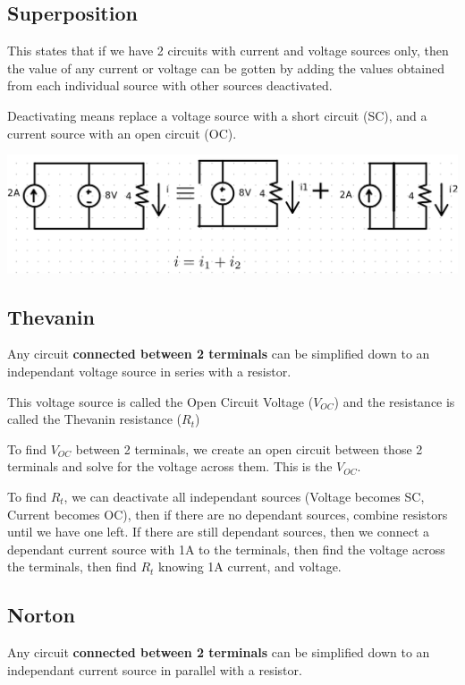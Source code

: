 \documentclass[12pt,letterpaper]{article} \usepackage{amsmath} \usepackage{graphicx} \usepackage[margin=1in]{geometry} \usepackage{longtable}  \usepackage{amssymb}
\begin{document}
	\subsection{Superposition}
	This states that if we have 2 circuits with current and voltage sources only, then the value of any current or voltage can be gotten by adding the values obtained from each individual source with other sources deactivated.
	
	Deactivating means replace a voltage source with a short circuit (SC), and a current source with an open circuit (OC).
	\begin{center}
		\includegraphics[width=0.9\linewidth]{superposition}
	\end{center}
	
	\subsection{Thevanin}
	Any circuit \textbf{connected between 2 terminals} can be simplified down to an independant voltage source in series with a resistor. 
	
	This voltage source is called the Open Circuit Voltage ($V_{OC}$) and the resistance is called the Thevanin resistance ($R_t$)
	
	To find $V_{OC}$ between 2 terminals, we create an open circuit between those 2 terminals and solve for the voltage across them. This is the $V_{OC}$.
	
	To find $R_t$, we can deactivate all independant sources (Voltage becomes SC, Current becomes OC), then if there are no dependant sources, combine resistors until we have one left. If there are still dependant sources, then we connect a dependant current source with 1A to the terminals, then find the voltage across the terminals, then find $R_t$ knowing 1A current, and voltage. 
	
	\subsection{Norton}
	Any circuit \textbf{connected between 2 terminals} can be simplified down to an independant current source in parallel with a resistor. 
	
\end{document}
